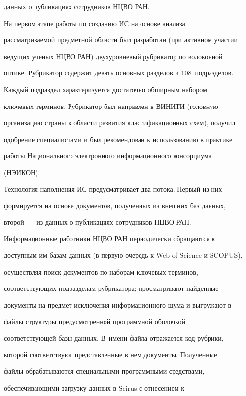 данных о публикациях сотрудников НЦВО РАН.


    


    На первом этапе работы по созданию ИС на основе анализа 


рассматриваемой предметной области был разработан (при активном участии 


ведущих ученых НЦВО РАН) двухуровневый рубрикатор по волоконной 


оптике. Рубрикатор содержит девять основных разделов и 108~подразделов. 


Каждый подраздел характеризуется достаточно обширным набором 


ключевых терминов. Рубрикатор был направлен в ВИНИТИ (головную 


организацию страны в области развития классификационных схем), получил 


одобрение специалистами и был рекомендован к использованию в практике 


работы Национального электронного информационного консорциума 


(НЭИКОН). 


    


    Технология наполнения ИС предусматривает два потока. Первый из них 


формируется на основе документов, полученных из внешних баз данных, 


второй~--- из данных о публикациях сотрудников НЦВО РАН. 


Информационные работники НЦВО РАН периодически обращаются к 


доступным им базам данных (в первую очередь к Web of Science и SCOPUS), 


осуществляя поиск документов по наборам ключевых терминов, 


соответствующих подразделам рубрикатора; просматривают найденные 


документы на предмет исключения информационного шума и выгружают в 


файлы структуры предусмотренной программной оболочкой 


соответствующей базы данных. В~имени файла отражается код рубрики, 


которой соответствуют представленные в нем документы. Полученные 


файлы обрабатываются специальными программными средствами, 


обеспечивающими загрузку данных в Scirus с отнесением к 


